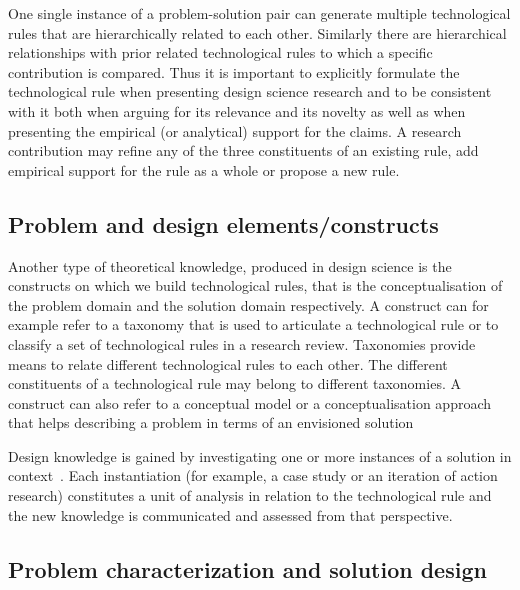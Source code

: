 \documentclass[graybox]{svmult}
\begin{document}
One single instance of a problem-solution pair can generate multiple technological rules that are hierarchically related to each other. Similarly there are hierarchical relationships with prior related technological rules to which a specific contribution is compared.
Thus it is important to explicitly formulate the technological rule when presenting design science research and to be consistent with it both when arguing for its relevance and its novelty as well as when presenting the empirical (or analytical) support for the claims.  A research contribution may refine any of the three constituents of an existing rule, add empirical support for the rule as a whole or propose a new rule.



\subsection{Problem and design elements/constructs}
\label{sec:constructs}
Another type of theoretical knowledge, produced in design science is the 
constructs on which we build technological rules, that is the conceptualisation of the problem domain and the solution domain respectively.  
A construct can for example refer to a taxonomy that is used to articulate a technological rule or to classify a set of technological rules in a research review. Taxonomies provide means to relate different technological rules to each other. The different constituents of a technological rule may belong to different taxonomies. A construct can also refer to a conceptual model or a conceptualisation approach that helps describing a problem in terms of an envisioned solution

Design knowledge is gained by investigating one or more instances of a solution in context~\cite{wieringa_what_2014}. Each instantiation (for example, a case study or an iteration of action research) constitutes a unit of analysis in relation to the technological rule and the new knowledge is communicated and assessed from that perspective. 

\subsection{Problem characterization and solution design}


\end{document}
